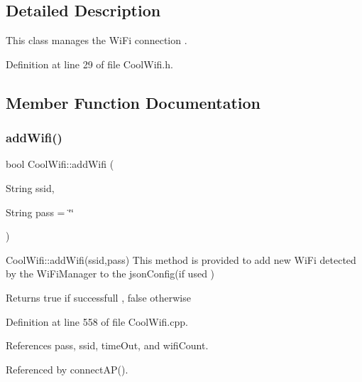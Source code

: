 \subsection{Detailed Description}
This class manages the Wi\+Fi connection . 

Definition at line 29 of file Cool\+Wifi.\+h.



\subsection{Member Function Documentation}
\mbox{\label{classCoolWifi_a914d7a1df14dd6b75345fb614c34e9d6}} 
\subsubsection{\texorpdfstring{add\+Wifi()}{addWifi()}}
{\footnotesize\ttfamily bool Cool\+Wifi\+::add\+Wifi (\begin{DoxyParamCaption}\item[{String}]{ssid,  }\item[{String}]{pass = {\ttfamily \char`\"{}\char`\"{}} }\end{DoxyParamCaption})}

Cool\+Wifi\+::add\+Wifi(ssid,pass) This method is provided to add new Wi\+Fi detected by the Wi\+Fi\+Manager to the json\+Config(if used )

\begin{DoxyReturn}{Returns}
true if successfull , false otherwise 
\end{DoxyReturn}


Definition at line 558 of file Cool\+Wifi.\+cpp.



References pass, ssid, time\+Out, and wifi\+Count.



Referenced by connect\+A\+P().



